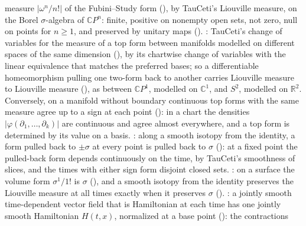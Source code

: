 \documentclass[11pt]{article}
\begin{document}
\begin{itemize}
  measure $|\omega^n/n!|$ of the Fubini--Study form (),
  by TauCeti's Liouville measure, on the Borel $\sigma$-algebra of $\mathbb CP^n$: finite, positive
  on nonempty open sets, not zero, null on points for $n \ge 1$, and preserved by unitary maps
  ().\newline
  : TauCeti's change of
  variables for the measure of a top form between manifolds modelled on different spaces of the
  same dimension (), by its chartwise
  change of variables with the linear equivalence that matches the preferred bases; so a
  differentiable homeomorphism pulling one two-form back to another carries Liouville measure to
  Liouville measure (), as
  between $\mathbb CP^1$, modelled on $\mathbb C^1$, and $S^2$, modelled on $\mathbb R^2$.
  Conversely, on a manifold without boundary continuous top forms with the same measure agree up
  to a sign at each point (): in a chart the
  densities $|\varphi(\partial_1, \dots, \partial_k)|$ are continuous and agree almost everywhere,
  and a top form is determined by its value on a basis.\newline
  : along a smooth isotopy
  from the identity, a form pulled back to $\pm\sigma$ at every point is pulled back to $\sigma$
  (): at a fixed point the pulled-back form
  depends continuously on the time, by TauCeti's smoothness of slices, and the times with either
  sign form disjoint closed sets.\newline
  : on a surface the volume form
  $\sigma^1/1!$ is $\sigma$ (), and a smooth isotopy
  from the identity preserves the Liouville measure at all times exactly when it preserves $\sigma$
  ().\newline
  : a jointly smooth
  time-dependent vector field that is Hamiltonian at each time has one jointly smooth Hamiltonian
  $H(t, x)$, normalized at a base point
  (): the contractions

\end{itemize}
\end{document}

